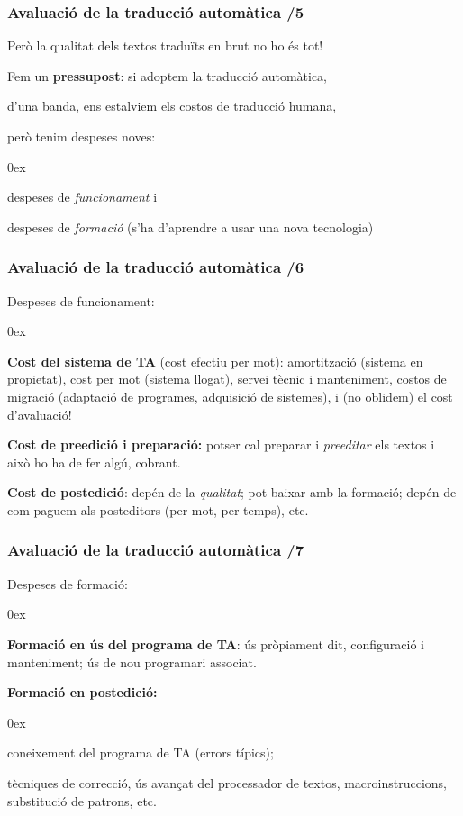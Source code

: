 \documentclass{beamer}
\newcommand{\empha}[1]{\emph{#1}\/}
\begin{document}
\begin{frame}
  \frametitle{ Avaluació de la traducció automàtica /5}
{
{Però la qualitat dels textos traduïts en brut no ho és tot!}

{Fem un \textbf{pressupost}: si adoptem la traducció automàtica,}

{d'una banda, ens estalviem els costos de traducció humana,}

{però tenim despeses noves:}

\begin{itemize}\itemsep 0ex
{\item despeses de \empha{funcionament} i}
{\item despeses de \empha{formació} (s'ha d'aprendre a usar una nova
  tecnologia)} 
\end{itemize}

}
\end{frame}
\begin{frame}
  \frametitle{ Avaluació de la traducció automàtica /6}
{
{Despeses de funcionament:}
\begin{itemize}\itemsep 0ex
  {\item \textbf{Cost del sistema de TA} (cost efectiu per mot):
    amortització (sistema en propietat), cost per mot (sistema llogat), servei
    tècnic i manteniment, costos de migració (adaptació de programes,
    adquisició de sistemes), i (no oblidem) el cost d'avaluació!}
  {\item \textbf{Cost de preedició i preparació:} potser cal preparar i 
    \emph{preeditar} els textos i això ho ha de fer algú, cobrant.}   {\item
      \textbf{Cost de postedició}: depén de la \empha{qualitat}; pot baixar amb
      la formació; depén de com paguem als posteditors (per mot, per temps),
      etc.}
\end{itemize}

}
\end{frame}
\begin{frame}
  \frametitle{ Avaluació de la traducció automàtica /7}
{
{Despeses de formació:}
\begin{itemize}\itemsep 0ex
  {\item \textbf{Formació en ús del programa de TA}: ús pròpiament dit,
    configuració i manteniment; ús de nou programari associat.}  
  
  {\item \textbf{Formació en postedició:}}
    \begin{itemize}\itemsep 0ex
    {\item coneixement del programa de TA
    (errors típics);}
    {\item tècniques de correcció, ús avançat del processador de textos,
    macroinstruccions, substitució de patrons, etc.}
    \end{itemize}
\end{itemize}
}

\end{frame}
\end{document}
